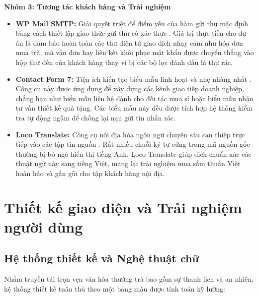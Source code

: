 \textbf{Nhóm 3: Tương tác khách hàng và Trải nghiệm}
\begin{itemize}
	\item \textbf{WP Mail SMTP:} Giải quyết triệt để điểm yếu của hàm gửi thư mặc định bằng cách thiết lập giao thức gửi thư có xác thực \cite{plugin_wp_mail_smtp}. Giá trị thực tiễn cho dự án là đảm bảo hoàn toàn các thư điện tử giao dịch nhạy cảm như hóa đơn mua trà, mã vận đơn hay liên kết khôi phục mật khẩu được chuyển thẳng vào hộp thư đến của khách hàng thay vì bị các bộ lọc đánh dấu là thư rác.
	\item \textbf{Contact Form 7:} Tiện ích kiến tạo biểu mẫu linh hoạt và nhẹ nhàng nhất \cite{plugin_contact_form_7}. Công cụ này được ứng dụng để xây dựng các kênh giao tiếp doanh nghiệp, chẳng hạn như biểu mẫu liên hệ dành cho đối tác mua sỉ hoặc biểu mẫu nhận tư vấn thiết kế quà tặng. Các biểu mẫu này đều được tích hợp hệ thống kiểm tra tự động ngầm để chống lại nạn gửi tin nhắn rác.
	\item \textbf{Loco Translate:} Công cụ nội địa hóa ngôn ngữ chuyên sâu can thiệp trực tiếp vào các tập tin nguồn \cite{plugin_loco_translate}. Rất nhiều chuỗi ký tự cứng trong mã nguồn gốc thường bị bỏ ngỏ hiển thị tiếng Anh. Loco Translate giúp dịch chuẩn xác các thuật ngữ này sang tiếng Việt, mang lại trải nghiệm mua sắm thuần Việt hoàn hảo và gần gũi cho tập khách hàng nội địa.
\end{itemize}

\section{Thiết kế giao diện và Trải nghiệm người dùng}

\subsection{Hệ thống thiết kế và Nghệ thuật chữ}
Nhằm truyền tải trọn vẹn văn hóa thưởng trà bao gồm sự thanh lịch và an nhiên, hệ thống thiết kế tuân thủ theo một bảng màu được tính toán kỹ lưỡng:

